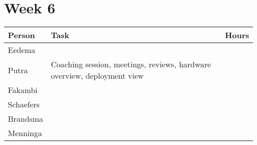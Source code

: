 \section{Week 6}
\begin{tabular}{p{} p{} p{}}
    \textbf{Person} & \textbf{Task} & \textbf{Hours} \\ \midrule
	Eedema & & \\ \midrule
	Putra & Coaching session, meetings, reviews, hardware overview, deployment view &  \\ \midrule
	Fakambi & & \\ \midrule
	Schaefers &  & \\ \midrule
	Brandsma & &  \\ \midrule
	Menninga &  & \\ \midrule
\end{tabular}